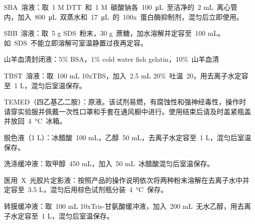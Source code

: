 \begin{compactitem}[\FourClowerSolid]
$$\vspace{2ex}
\item SBA\ 溶液：取\ 1 M DTT\ 和\ 1 M\ 碳酸钠各\ \SI{100}{\uL}\ 至洁净的\ 2 mL\ 离心管内，加入\
\SI{800}{\uL}\ 双蒸水和\
\SI{17}{\uL}\ 的\ 100x\ 蛋白酶抑制剂，混匀后立即使用。
\vspace{2ex}
\item SBB\ 溶液：取\ 5 g SDS\ 粉末，30 g\ 蔗糖，加水溶解并定容至\ 100 mL。如\ SDS\ 不能立即溶解可室温静置过夜再定容。
\vspace{2ex}
\item 山羊血清封闭液：5\% BSA，1\% cold water fish gelatin，10\%\ 山羊血清
\vspace{2ex}
\item TBST\ 溶液：取\ 100 mL 10xTBS，加入\ 2.5 mL 20\%\ 吐温\ 20，用去离子水定容至\ 1 L，混匀后室温保存。
\vspace{2ex}
\item TEMED（四乙基乙二胺）：原液。该试剂易燃，有腐蚀性和强神经毒性，操作时请穿实验服并佩戴一次性口罩和手套在通风橱中进行。使用结束后请及时盖紧瓶盖并放回\ \SI{4}{\degreeCelsius}\ 冰箱。
\vspace{2ex}
\item 脱色液（1 L）：冰醋酸\ 100 mL，乙醇\ 50 mL，去离子水定容至\ 1 L，混匀后室温保存。
\vspace{2ex}
\item 洗涤缓冲液：取甲醇\ 450 mL，加入\ 50 mL\ 冰醋酸混匀后室温保存。
\vspace{2ex}
\item 医用\ X\ 光胶片定影液：按照产品的操作说明依次将两种粉末溶解在去离子水中并定容至\ 3.5 L，混匀后用棕色试剂瓶分装\ \SI{4}{\degreeCelsius}\ 保存。
\vspace{2ex}
\item 转膜缓冲液：取\ 100 mL 10xTris-甘氨酸缓冲液，加入\ 200 mL\ 无水乙醇，用去离子水定容至\ 1 L，混匀后室温保存。
\end{compactitem}